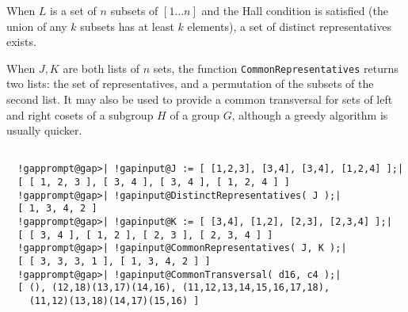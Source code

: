 \documentclass[a4paper,11pt]{report}
\begin{document}
{{{ When $L$ is a set of $n$ subsets of $[1 \ldots n]$ and the Hall condition is satisfied (the union of any $k$ subsets has at least $k$ elements), a set of distinct representatives exists. 

 When $J,K$ are both lists of $n$ sets, the function \texttt{CommonRepresentatives} returns two lists: the set of representatives, and a permutation of the
subsets of the second list. It may also be used to provide a common
transversal for sets of left and right cosets of a subgroup $H$ of a group $G$, although a greedy algorithm is usually quicker. }

 
\begin{Verbatim}[commandchars=!@|,fontsize=\small,frame=single,label=Example]
  
  !gapprompt@gap>| !gapinput@J := [ [1,2,3], [3,4], [3,4], [1,2,4] ];|
  [ [ 1, 2, 3 ], [ 3, 4 ], [ 3, 4 ], [ 1, 2, 4 ] ]
  !gapprompt@gap>| !gapinput@DistinctRepresentatives( J );|
  [ 1, 3, 4, 2 ]
  !gapprompt@gap>| !gapinput@K := [ [3,4], [1,2], [2,3], [2,3,4] ];|
  [ [ 3, 4 ], [ 1, 2 ], [ 2, 3 ], [ 2, 3, 4 ] ]
  !gapprompt@gap>| !gapinput@CommonRepresentatives( J, K );|
  [ [ 3, 3, 3, 1 ], [ 1, 3, 4, 2 ] ]
  !gapprompt@gap>| !gapinput@CommonTransversal( d16, c4 );|
  [ (), (12,18)(13,17)(14,16), (11,12,13,14,15,16,17,18), 
    (11,12)(13,18)(14,17)(15,16) ]
  
\end{Verbatim}
 }

 }

            
\end{document}

